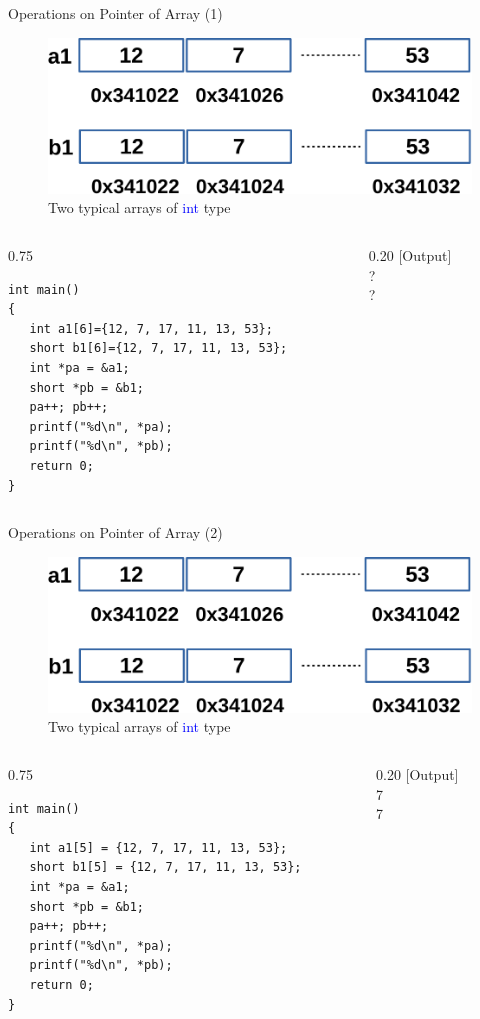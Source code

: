 \begin{frame}[fragile]{Operations on Pointer of Array (1)}
\begin{figure}
	\includegraphics[width=0.48\linewidth]{figs/array1.pdf}
	\caption{Two typical arrays of \textcolor{blue}{int} type}
\end{figure}
\vspace{-0.25in}
\begin{columns}
\begin{column}{0.75\linewidth}
\begin{lstlisting}[xleftmargin=0.02\linewidth, linewidth=0.98\linewidth]
int main()
{
   int a1[6]={12, 7, 17, 11, 13, 53};
   short b1[6]={12, 7, 17, 11, 13, 53};
   int *pa = &a1;
   short *pb = &b1;
   pa++; pb++;
   printf("%d\n", *pa);
   printf("%d\n", *pb);
   return 0;
}
\end{lstlisting}
\end{column}
\begin{column}{0.20\linewidth}
[Output]\\
?\\
?
\end{column}
\end{columns}
\end{frame}

\begin{frame}[fragile]{Operations on Pointer of Array (2)}
\begin{figure}
	\includegraphics[width=0.48\linewidth]{figs/array1.pdf}
	\caption{Two typical arrays of \textcolor{blue}{int} type}
\end{figure}
\vspace{-0.25in}
\begin{columns}
\begin{column}{0.75\linewidth}
\begin{lstlisting}[xleftmargin=0.02\linewidth, linewidth=0.98\linewidth]
int main()
{
   int a1[5] = {12, 7, 17, 11, 13, 53};
   short b1[5] = {12, 7, 17, 11, 13, 53};
   int *pa = &a1;
   short *pb = &b1;
   pa++; pb++;
   printf("%d\n", *pa);
   printf("%d\n", *pb);
   return 0;
}
\end{lstlisting}
\end{column}
\begin{column}{0.20\linewidth}
[Output]\\
7\\
7
\end{column}
\end{columns}
\end{frame}

